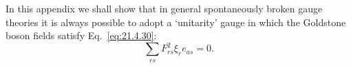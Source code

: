 
\label{app:21.A}

In this appendix we shall show that in general spontaneously broken gauge
theories it is always possible to adopt a `unitarity' gauge in which the
Goldstone boson fields satisfy Eq.~\eqref{eq:21.4.30}:
\begin{equation}
 \sum_{rs}F_{rs}^2\xi_r e_{a s}=0.
 \tag{21.A.1}\label{eq:21.A.1}
\end{equation}

